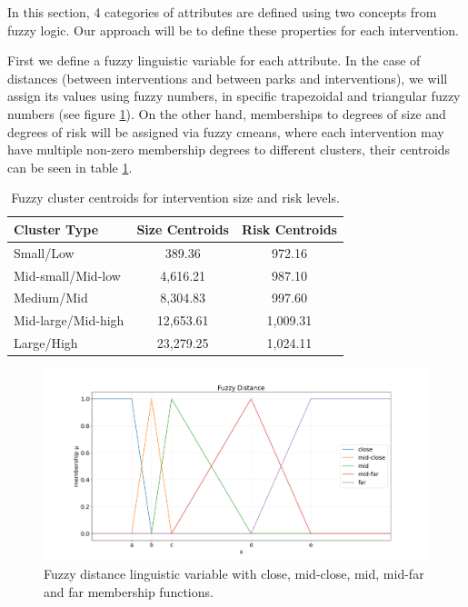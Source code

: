 In this section, 4 categories of attributes are defined using two concepts from fuzzy logic. Our approach will be to define these properties for each intervention.

First we define a fuzzy linguistic variable for each attribute. In the case of distances (between interventions and between parks and interventions), we will assign its values using fuzzy numbers, in specific trapezoidal and triangular fuzzy numbers (see figure \ref{fig:fuzzy_distance}). On the other hand, memberships to degrees of size and degrees of risk will be assigned via fuzzy cmeans, where each intervention may have multiple non-zero membership degrees to different clusters, their centroids can be seen in table \ref{tab:fuzzy_centroids}.

\begin{table}[!ht]
    \centering
    \begin{tabular}{lcc}
    \hline
    \textbf{Cluster Type} & \textbf{Size Centroids} & \textbf{Risk Centroids} \\
    \hline
    Small/Low & 389.36 & 972.16 \\
    Mid-small/Mid-low & 4,616.21 & 987.10 \\
    Medium/Mid & 8,304.83 & 997.60 \\
    Mid-large/Mid-high & 12,653.61 & 1,009.31 \\
    Large/High & 23,279.25 & 1,024.11 \\
    \hline
    \end{tabular}
    \caption{Fuzzy cluster centroids for intervention size and risk levels.}
    \label{tab:fuzzy_centroids}
    \end{table}
    
    
    \begin{figure}[!ht]
    \centering
    \includegraphics[width=\linewidth]{ch3/figures/Fuzzy distance.png}
    \caption{Fuzzy distance linguistic variable with close, mid-close, mid, mid-far and far membership functions.}
    \label{fig:fuzzy_distance}
    \end{figure}

